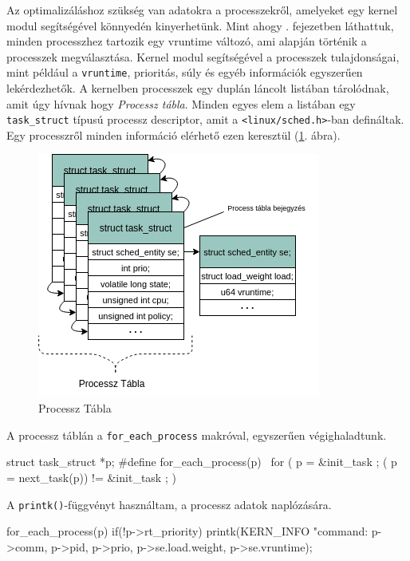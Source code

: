 

Az optimalizáláshoz szükség van adatokra a processzekről, amelyeket egy kernel modul segítségével könnyedén kinyerhetünk.
Mint ahogy . fejezetben láthattuk, minden processzhez tartozik egy vruntime változó, ami alapján történik a processzek megválasztása. 
Kernel modul segítségével a processzek tulajdonságai, mint például a \texttt{vruntime}, prioritás, súly és egyéb információk egyszerűen lekérdezhetők.
A kernelben processzek egy duplán láncolt listában tárolódnak, amit úgy hívnak hogy \textit{Processz tábla}. Minden egyes elem a listában egy \texttt{task\_struct} típusú processz descriptor, amit a \texttt{<linux/sched.h>}-ban defináltak. Egy processzről minden információ elérhető ezen keresztül (\ref{fig:structurehierarchi}. ábra).

\begin{figure}[h!]
\centering
\includegraphics[scale=0.75]{images/processTable.png}
\caption{Processz Tábla}
\label{fig:structurehierarchi}
\end{figure}

\noindent A processz táblán a \texttt{for\_each\_process} makróval, egyszerűen végighaladtunk.
\begin{cpp}
struct task_struct *p;
#define for_each_process(p) \
	 for ( p = &init_task ; ( p = next_task(p)) != &init_task ; )
\end{cpp}
A \texttt{printk()}-függvényt használtam, a processz adatok naplózására.
\begin{cpp}
for_each_process(p)
    if(!p->rt_priority)
        printk(KERN_INFO
        "command: %
        p->comm, p->pid, p->prio, p->se.load.weight, p->se.vruntime);

\end{cpp}

